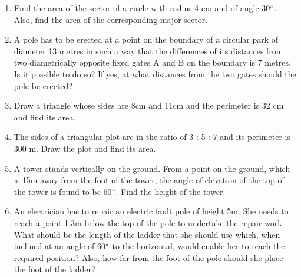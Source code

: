 \begin{enumerate}[label=\arabic*.,ref=\thesubsection.\theenumi]
\item Find the area of the sector of a circle with radius 4 cm and of angle 30$\degree$. Also, find the area of the corresponding major sector.
\item A pole has to be erected at a point on the boundary of a circular park of diameter 13 metres in such a way that the differences of its distances from two diametrically opposite fixed gates A and B on the boundary is 7 metres. Is it possible to do so? If yes, at what distances from the two gates should the pole be erected?
%
\item Draw a triangle whose sides are 8cm and 11cm and the perimeter is 32 cm and find its area.
%
%

%
\item The sides of a triangular plot are in the ratio of 3 : 5 : 7 and its perimeter is 300 m. Draw the plot and find its area.
\item A tower stands vertically on the ground.  From a point on the ground, which is 15m away from the foot of the tower, the angle of elevation of the top of the tower is found to be 60$\degree$.  Find the height of the tower.
%
%
\item An electrician has to repair an electric fault pole of height 5m.  She needs to reach a point 1.3m below the top of the pole to undertake the repair work.  What should be the length of the ladder that she should use which, when inclined at an angle of 60$\degree$ to the horizontal, would enable her to reach the required position?  Also, how far from the foot of the pole should she place the foot of the ladder?

\end{enumerate}
